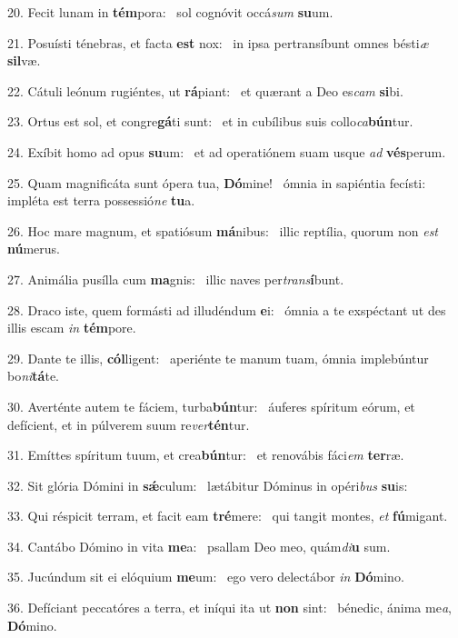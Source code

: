 20. Fecit lunam in \textbf{tém}pora: \ast\  sol cognóvit occá\textit{sum} \textbf{su}um.\

21. Posuísti ténebras, et facta \textbf{est} nox: \ast\  in ipsa pertransíbunt omnes bésti\textit{æ} \textbf{sil}væ.\

22. Cátuli leónum rugiéntes, ut \textbf{rá}piant: \ast\  et quærant a Deo es\textit{cam} \textbf{si}bi.\

23. Ortus est sol, et congre\textbf{gá}ti sunt: \ast\  et in cubílibus suis collo\textit{ca}\textbf{bún}tur.\

24. Exíbit homo ad opus \textbf{su}um: \ast\  et ad operatiónem suam usque \textit{ad} \textbf{vés}perum.\

25. Quam magnificáta sunt ópera tua, \textbf{Dó}mine! \ast\  ómnia in sapiéntia fecísti: impléta est terra possessió\textit{ne} \textbf{tu}a.\

26. Hoc mare magnum, et spatiósum \textbf{má}nibus: \ast\  illic reptília, quorum non \textit{est} \textbf{nú}merus.\

27. Animália pusílla cum \textbf{ma}gnis: \ast\  illic naves per\textit{trans}\textbf{í}bunt.\

28. Draco iste, quem formásti ad illudéndum \textbf{e}i: \ast\  ómnia a te exspéctant ut des illis escam \textit{in} \textbf{tém}pore.\

29. Dante te illis, \textbf{cól}ligent: \ast\  aperiénte te manum tuam, ómnia implebúntur bo\textit{ni}\textbf{tá}te.\

30. Averténte autem te fáciem, turba\textbf{bún}tur: \ast\  áuferes spíritum eórum, et defícient, et in púlverem suum re\textit{ver}\textbf{tén}tur.\

31. Emíttes spíritum tuum, et crea\textbf{bún}tur: \ast\  et renovábis fáci\textit{em} \textbf{ter}ræ.\

32. Sit glória Dómini in \textbf{sǽ}culum: \ast\  lætábitur Dóminus in opéri\textit{bus} \textbf{su}is:\

33. Qui réspicit terram, et facit eam \textbf{tré}mere: \ast\  qui tangit montes, \textit{et} \textbf{fú}migant.\

34. Cantábo Dómino in vita \textbf{me}a: \ast\  psallam Deo meo, quám\textit{di}\textbf{u} sum.\

35. Jucúndum sit ei elóquium \textbf{me}um: \ast\  ego vero delectábor \textit{in} \textbf{Dó}mino.\

36. Defíciant peccatóres a terra, et iníqui ita ut \textbf{non} sint: \ast\  bénedic, ánima me\textit{a}, \textbf{Dó}mino.\

